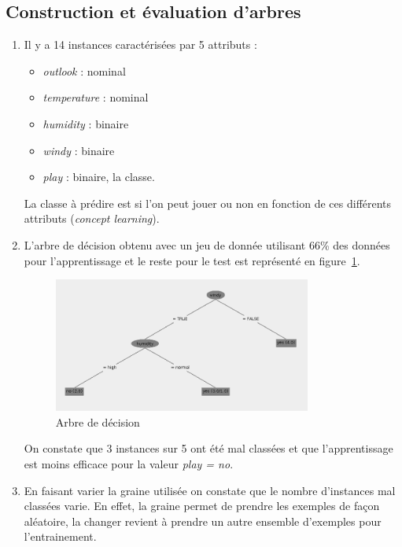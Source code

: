 \documentclass[a4paper]{article}
\begin{document}
\subsection{Construction et évaluation d'arbres}
\begin{enumerate}

\item
 Il y a 14 instances caractérisées par 5 attributs : 
	\begin{itemize}
		\item \textit{outlook} : nominal 	
		\item \textit{temperature} : nominal 
		\item \textit{humidity} : binaire
		\item \textit{windy} : binaire
		\item \textit{play} : binaire, la classe.
	\end{itemize}
	La classe à prédire est si l'on peut jouer ou non en fonction de ces différents attributs (\textit{concept learning}).


\item
	L'arbre de décision obtenu avec un jeu de donnée utilisant 66\% des données pour l'apprentissage et le reste pour le test est représenté en figure~\ref{fig:Arbre}.

	\begin{figure}[h]
	  \begin{center}
	    \includegraphics[width=0.8\textwidth]{ArbreInit.png}
	    \caption{Arbre de décision}
	    \label{fig:Arbre} 
	  \end{center}
	\end{figure}

On constate que 3 instances sur 5 ont été mal classées et que l'apprentissage est moins efficace pour la valeur \textit{play = no}.

\item 
En faisant varier la graine utilisée on constate que le nombre d'instances mal classées varie. En effet, la graine permet de prendre les exemples de façon aléatoire, la changer revient à prendre un autre ensemble d'exemples pour l'entrainement. 


\end{enumerate}
\end{document}
